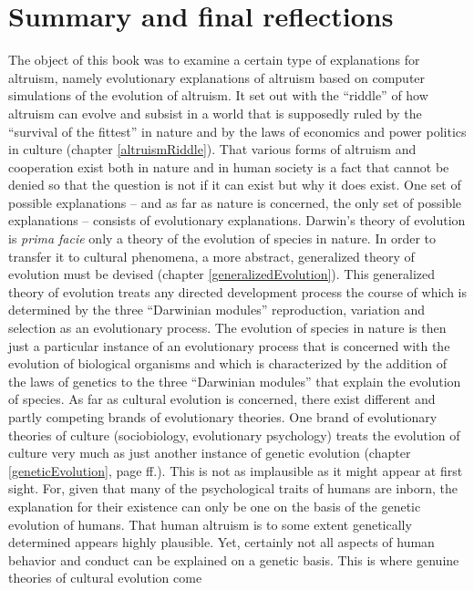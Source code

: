 \chapter{Summary and final reflections}

The object of this book was to examine a certain type of explanations for
altruism, namely evolutionary explanations of altruism based on computer
simulations of the evolution of altruism. It set out with the ``riddle'' of how
altruism can evolve and subsist in a world that is supposedly ruled by the
``survival of the fittest'' in nature and by the laws of economics and power
politics in culture (chapter \ref{altruismRiddle}). That various forms of
altruism and cooperation exist both in nature and in human society is a fact
that cannot be denied so that the question is not if it can exist but why it
does exist. One set of possible explanations -- and as far as nature is
concerned, the only set of possible explanations -- consists of evolutionary
explanations. Darwin's theory of evolution is {\em prima facie} only a theory
of the evolution of species in nature. In order to transfer it to cultural
phenomena, a more abstract, generalized theory of evolution must be devised
(chapter \ref{generalizedEvolution}). This generalized theory of evolution
treats any directed development process the course of which is determined by the three
``Darwinian modules'' reproduction, variation and selection as an evolutionary
process. The evolution of species in nature is then just a particular instance
of an evolutionary process that is concerned with the evolution of biological
organisms and which is characterized by the addition of the laws of genetics to
the three ``Darwinian modules'' that explain the evolution of species. As far
as cultural evolution is concerned, there exist different and partly competing
brands of evolutionary theories. One brand of evolutionary theories of culture
(sociobiology, evolutionary psychology) treats the evolution of culture very
much as just another instance of genetic evolution (chapter
\ref{geneticEvolution}, page \pageref{geneticEvolution}ff.). This is not as
implausible as it might appear at first sight. For, given that many of the
psychological traits of humans are inborn, the explanation for their existence
can only be one on the basis of the genetic evolution of humans. That human
altruism is to some extent genetically determined appears highly plausible.
Yet, certainly not all aspects of human behavior and conduct can be explained
on a genetic basis. This is where genuine theories of cultural evolution come

